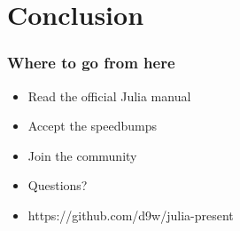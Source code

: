 \section{Conclusion}
\frame
{
	\frametitle{Where to go from here}
  \begin{itemize}
    \item Read the official Julia manual
    \item Accept the speedbumps
    \item Join the community
    \item Questions?
    \item https://github.com/d9w/julia-present
  \end{itemize}
}
